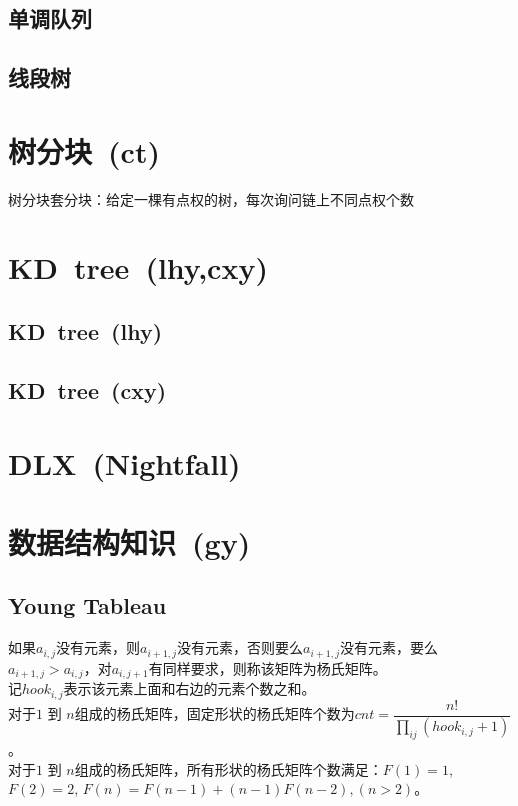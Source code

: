     \subsection*{单调队列}
    \subsection*{线段树}

\section{树分块~\small(ct)}
    树分块套分块：给定一棵有点权的树，每次询问链上不同点权个数

\section{KD~tree~\small(lhy,cxy)}
    \subsection*{KD~tree~\small(lhy)}
    \subsection*{KD~tree~\small(cxy)}

\section{DLX~\small(Nightfall)}

\section{数据结构知识~\small(gy)}
    \subsection*{Young Tableau}
        如果$ a_{i, j} $没有元素，则$ a_{i + 1, j} $没有元素，否则要么$ a_{i + 1, j} $没有元素，要么$ a_{i + 1, j} > a_{i, j} $，对$ a_{i, j + 1} $有同样要求，则称该矩阵为杨氏矩阵。\\
        记$ hook_{i, j} $表示该元素上面和右边的元素个数之和。\\
        对于$ 1 $ 到 $ n $组成的杨氏矩阵，固定形状的杨氏矩阵个数为$ cnt = \dfrac{n!}{\prod\limits_{ij} (hook_{i, j} + 1)} $。\\
        对于$ 1 $ 到 $ n $组成的杨氏矩阵，所有形状的杨氏矩阵个数满足：$ F(1) = 1 $, $ F(2) = 2 $, $ F(n) = F(n - 1) + (n - 1) F(n - 2), (n > 2) $。
